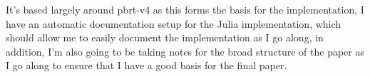 \documentclass[11pt,a4paper,oneside]{article}
\begin{document}
It's based largely around pbrt-v4 as this forms the basis for the implementation, I have an automatic documentation setup for the Julia implementation, which should allow me to easily document the implementation as I go along, in addition, I'm also going to be taking notes for the broad structure of the paper as I go along to ensure that I have a good basis for the final paper. 

\newpage

\printbibliography
\end{document}
